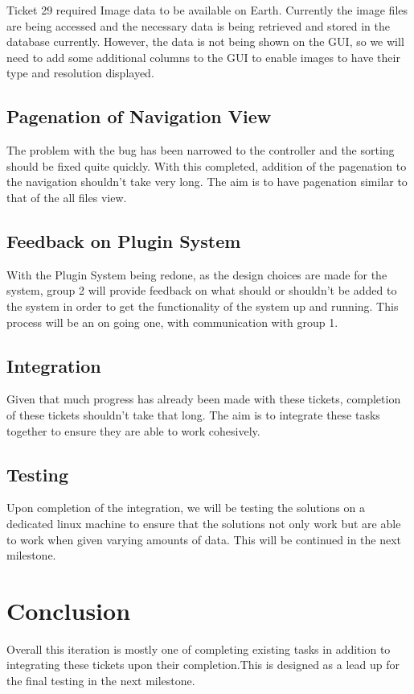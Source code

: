 \documentclass{article}
\begin{document}
Ticket 29 required Image data to be available on Earth. Currently the image files are being accessed and the necessary data is being retrieved and stored in the database currently. However, the data is not being shown on the GUI, so we will need to add some additional columns to the GUI to enable images to have their type and resolution displayed.

\subsection{Pagenation of Navigation View}

The problem with the bug has been narrowed to the controller and the sorting should be fixed quite quickly. With this completed, addition of the pagenation to the navigation shouldn't take very long. The aim is to have pagenation similar to that of the all files view.

\subsection{Feedback on Plugin System}

With the Plugin System being redone, as the design choices are made for the system, group 2 will provide feedback on what should or shouldn't be added to the system in order to get the functionality of the system up and running. This process will be an on going one, with communication with group 1.

\subsection{Integration}

Given that much progress has already been made with these tickets, completion of these tickets shouldn't take that long. The aim is to integrate these tasks together to ensure they are able to work cohesively.

\subsection{Testing}

Upon completion of the integration, we will be testing the solutions on a dedicated linux machine to ensure that the solutions not only work but are able to work when given varying amounts of data. This will be continued in the next milestone.

\section{Conclusion}

Overall this iteration is mostly one of completing existing tasks in addition to integrating these tickets upon their completion.This is designed as a lead up for the final testing in the next milestone.
\end{document}
